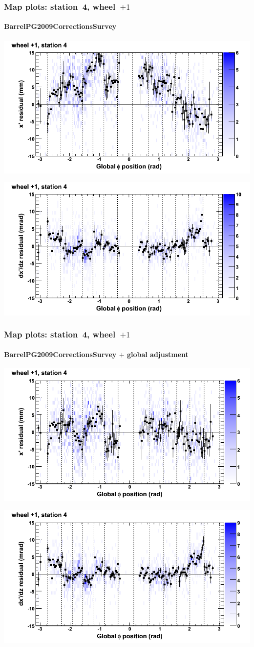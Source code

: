 \documentclass[compress]{beamer}
\begin{document}
\begin{frame}
\frametitle{Map plots: station~4, wheel~$+1$}
\framesubtitle{BarrelPG2009CorrectionsSurvey}
\includegraphics[width=0.5\linewidth]{mapplots_01/DTvsphi_st4whD_x.png}

\includegraphics[width=0.5\linewidth]{mapplots_01/DTvsphi_st4whD_dxdz.png}
\end{frame}
\begin{frame}
\frametitle{Map plots: station~4, wheel~$+1$}
\framesubtitle{BarrelPG2009CorrectionsSurvey $+$ global adjustment}
\includegraphics[width=0.5\linewidth]{mapplots_re01/DTvsphi_st4whD_x.png}

\includegraphics[width=0.5\linewidth]{mapplots_re01/DTvsphi_st4whD_dxdz.png}
\end{frame}
\end{document}
